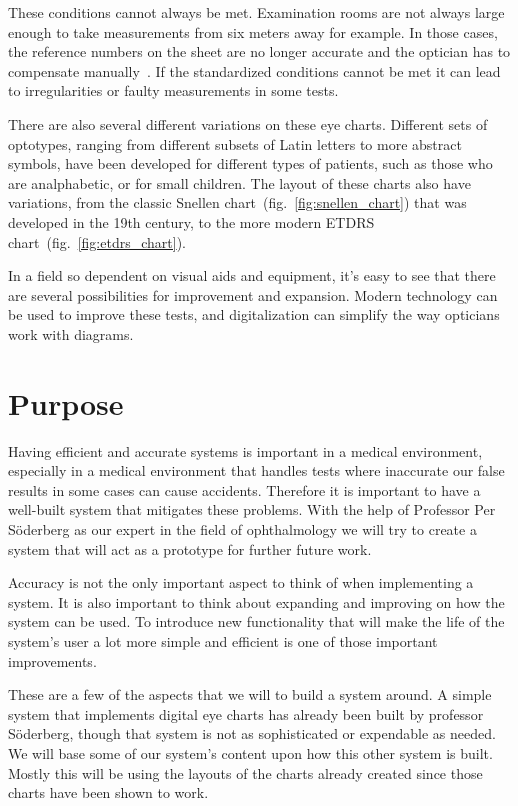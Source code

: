 \documentclass[12pt,a4paper,notitlepage]{report}
\begin{document}
These conditions cannot always be met. Examination rooms are not always large enough to take measurements from six meters away for example. In those cases, the reference numbers on the sheet are no longer accurate and the optician has to compensate manually~\cite{PGSoderberg}. If the standardized conditions cannot be met it can lead to irregularities or faulty measurements in some tests.

There are also several different variations on these eye charts. Different sets of optotypes, ranging from different subsets of Latin letters to more abstract symbols, have been developed for different types of patients, such as those who are analphabetic, or for small children. The layout of these charts also have variations, from the classic Snellen chart~(fig.~\ref{fig:snellen_chart}) that was developed in the 19th century, to the more modern ETDRS chart~(fig.~\ref{fig:etdrs_chart}).

In a field so dependent on visual aids and equipment, it's easy to see that there are several possibilities for improvement and expansion. Modern technology can be used to improve these tests, and digitalization can simplify the way opticians work with diagrams.

\section{Purpose}
Having efficient and accurate systems is important in a medical environment, especially in a medical environment that handles tests where inaccurate our false results in some cases can cause accidents. Therefore it is important to have a well-built system that mitigates these problems. With the help of Professor Per Söderberg as our expert in the field of ophthalmology we will try to create a system that will act as a prototype for further future work. 

Accuracy is not the only important aspect to think of when implementing a system. It is also important to think about expanding and improving on how the system can be used. To introduce new functionality that will make the life of the system's user a lot more simple and efficient is one of those important improvements. 

These are a few of the aspects that we will to build a system around. A simple system that implements digital eye charts has already been built by professor Söderberg, though that system is not as sophisticated or expendable as needed. We will base some of our system's content upon how this other system is built. Mostly this will be using the layouts of the charts already created since those charts have been shown to work. 
\end{document}
